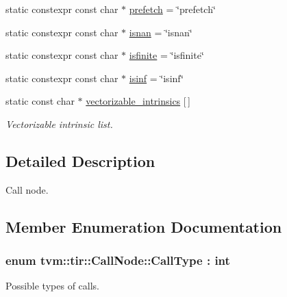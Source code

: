 \begin{DoxyCompactItemize}
static constexpr const char $\ast$ \hyperlink{classtvm_1_1tir_1_1CallNode_a747a64efc4f4a67067486f047de1c51a}{prefetch} = \char`\"{}prefetch\char`\"{}
\item 
static constexpr const char $\ast$ \hyperlink{classtvm_1_1tir_1_1CallNode_af9579b5cc850ea3d2b5d0e5cd88c4c9a}{isnan} = \char`\"{}isnan\char`\"{}
\item 
static constexpr const char $\ast$ \hyperlink{classtvm_1_1tir_1_1CallNode_ababe5c5ec515672f90018263dd186cd1}{isfinite} = \char`\"{}isfinite\char`\"{}
\item 
static constexpr const char $\ast$ \hyperlink{classtvm_1_1tir_1_1CallNode_ac302718e33b936c727233696982cc52d}{isinf} = \char`\"{}isinf\char`\"{}
\item 
static const char $\ast$ \hyperlink{classtvm_1_1tir_1_1CallNode_a33a7c5928493a7206f3efc0e43c7fc88}{vectorizable\+\_\+intrinsics} \mbox{[}$\,$\mbox{]}
\begin{DoxyCompactList}\small\item\em Vectorizable intrinsic list. \end{DoxyCompactList}\end{DoxyCompactItemize}


\subsection{Detailed Description}
Call node. 

\subsection{Member Enumeration Documentation}
\subsubsection[{\texorpdfstring{Call\+Type}{CallType}}]{\setlength{\rightskip}{0pt plus 5cm}enum {\bf tvm\+::tir\+::\+Call\+Node\+::\+Call\+Type} \+: int}\hypertarget{classtvm_1_1tir_1_1CallNode_a13e1f0f48f488fd085ca2684738fa97a}{}\label{classtvm_1_1tir_1_1CallNode_a13e1f0f48f488fd085ca2684738fa97a}


Possible types of calls. 

